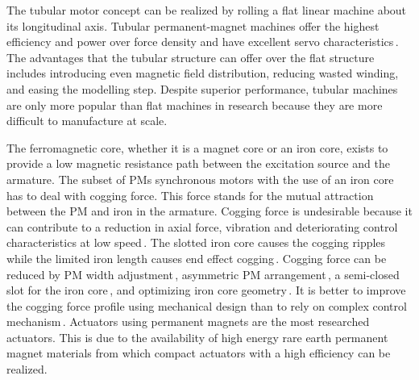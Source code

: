         
        The tubular motor concept can be realized by rolling a flat linear machine about its longitudinal axis. Tubular permanent-magnet machines offer the highest efficiency and power over force density and have excellent servo characteristics\,\cite{Eastham1990NovelDisc}. The advantages that the tubular structure can offer over the flat structure includes introducing even magnetic field distribution, reducing wasted winding, and easing the modelling step. Despite superior performance, tubular machines are only more popular than flat machines in research because they are more difficult to manufacture at scale.
        
        
        The ferromagnetic core, whether it is a magnet core or an iron core, exists to provide a low magnetic resistance path between the excitation source and the armature. The subset of \acp{PM} synchronous motors with the use of an iron core has to deal with cogging force. This force stands for the mutual attraction between the PM and iron in the armature. Cogging force is undesirable because it can contribute to a reduction in axial force, vibration and deteriorating control characteristics at low speed\,\cite{Jung1999}. The slotted iron core causes the cogging ripples while the limited iron length causes end effect cogging\,\cite{Lim2002}. Cogging force can be reduced by PM width adjustment\,\cite{Bianchi2002DesignMotors}, asymmetric PM arrangement\,\cite{Chung2016,Bianchi2003a,Cai2012}, a semi-closed slot for the iron core\,\cite{Zhu1997,Bai2015ReducingStructure,Zhu2008}, and optimizing iron core geometry\,\cite{Inoue2000,Zhu1997,Wu2008,Zhu2009conf,Zhang2013,Kim2016,Lee2014}. It is better to improve the cogging force profile using mechanical design than to rely on complex control mechanism\,\cite{Jahn1996}. Actuators using permanent magnets are the most researched actuators. This is due to the availability of high energy rare earth permanent magnet materials from which compact actuators with a high efficiency can be realized.
        
